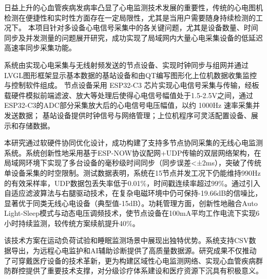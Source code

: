 
{}

\begin{abstractcn}
日益上升的心血管疾病发病率凸显了心电监测技术发展的重要性，传统的心电图机检测在便捷性和实时性方面存在一定局限性，尤其是当用户需要随身持续检测的工况下。
本项目针对多设备心电信号采集中的各关键问题，尤其是设备数量、时间同步及并发测量的问题展开研究，成功实现了局域网内大量心电采集设备的低延迟高速率同步采集功能。

系统由实现心电采集与无线射频发送的节点设备、实现时钟同步与组网并通过LVGL图形框架显示基本数据的基站设备和由QT编写图形化上位机数据收集监控与控制软件组成。
节点设备采用 ESP32-C3 芯片实现心电信号采集与传输，经板载硬件模拟前端滤波、放大等处理后使得心电信号幅值处于1.5-2.5V之间，通过ESP32-C3的ADC部分采集放大后的心电信号电压幅值，以约 1000Hz 速率采集并发送数据；
基站设备提供时钟信号与网络管理；上位机程序可灵活配置设备、展示和存储数据。

本研究通过软硬件协同优化设计，成功构建了支持多节点协同采集的无线心电监测系统。系统创新性地采用基于ESP-NOW协议配网+UDP传输的双层网络架构，在局域网环境下实现了多台设备的毫秒级时间同步（同步误差<±2ms），突破了传统单设备采集的时空限制。测试数据表明，系统在15节点并发工况下仍能维持990Hz的有效采样率，UDP数据包丢失率低于0.01\%，时间戳连续率超过99\%。通过引入自适应滤波算法与右腿驱动技术，在复杂电磁环境中仍可保持-19.66dB的信噪比，显著优于同类无线心电设备（典型值-15dB）。功耗管理方面，创新性地融合Auto Light-Sleep模式与动态电压调频技术，使节点设备在100mA平均工作电流下实现6小时持续监测，较传统方案续航提升40\%。

该技术方案在运动负荷试验和睡眠监测场景中展现出独特优势。系统支持CSV数据导出，为远程心电监护和AI辅助诊断提供了高质量数据源。研究成果不仅推动了可穿戴医疗设备的技术革新，更为构建区域性心电监测网络、实现心血管疾病群防群控提供了重要技术支撑，对分级诊疗体系建设和医疗资源下沉具有积极意义。


\end{abstractcn}